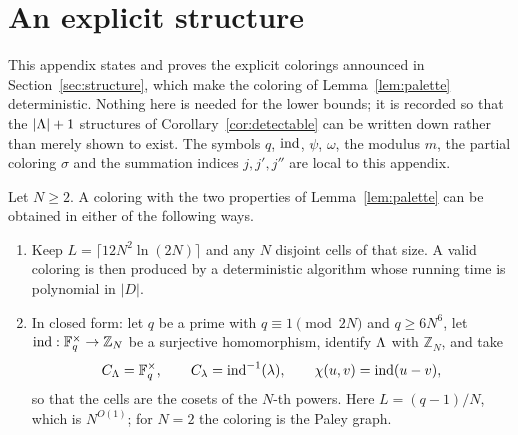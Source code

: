 \section{An explicit structure}\label{app:explicit}
This appendix states and proves the explicit colorings announced in
Section~\ref{sec:structure}, which make the coloring of
Lemma~\ref{lem:palette} deterministic. Nothing here is needed for the lower
bounds; it is recorded so that the $|\Lambda|+1$ structures of
Corollary~\ref{cor:detectable} can be written down rather than merely shown
to exist. The symbols $q$, $\operatorname{ind}$, $\psi$, $\omega$, the modulus $m$, the
partial coloring $\sigma$ and the summation indices $j,j',j''$ are local to
this appendix.

\begin{proposition}\label{prop:explicit}
Let $N\ge2$. A coloring with the two properties of Lemma~\ref{lem:palette}
can be obtained in either of the following ways.
\begin{enumerate}[nosep,label=(\alph*)]
\item Keep $L=\lceil12N^2\ln(2N)\rceil$ and any $N$ disjoint cells of that
 size. A valid coloring is then produced by a deterministic algorithm whose
 running time is polynomial in $|D|$.
\item In closed form: let $q$ be a prime with $q\equiv1\pmod{2N}$ and
 $q\ge6N^6$, let $\operatorname{ind}:\mathbb F_q^{\times}\to\mathbb Z_N$ be a surjective
 homomorphism, identify $\Lambda$ with $\mathbb Z_N$, and take
 \[
  C_{\Lambda}=\mathbb F_q^{\times},\qquad
  C_{\lambda}=\operatorname{ind}^{-1}(\lambda),\qquad
  \chi(u,v)=\operatorname{ind}(u-v),
 \]
 so that the cells are the cosets of the $N$-th powers. Here
 $L=(q-1)/N$, which is $N^{O(1)}$; for $N=2$ the coloring is the Paley
 graph.
\end{enumerate}
\end{proposition}

